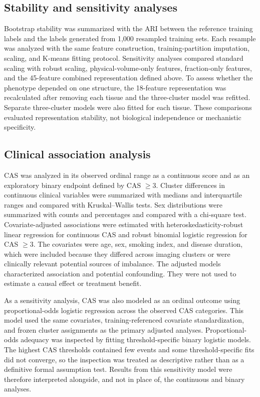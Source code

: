 \documentclass[utf8]{FrontiersinVancouver}
\begin{document}
\subsection{Stability and sensitivity analyses}
Bootstrap stability was summarized with the ARI between the reference training labels and the labels generated from 1,000 resampled training sets. Each resample was analyzed with the same feature construction, training-partition imputation, scaling, and K-means fitting protocol. Sensitivity analyses compared standard scaling with robust scaling, physical-volume-only features, fraction-only features, and the 45-feature combined representation defined above. To assess whether the phenotype depended on one structure, the 18-feature representation was recalculated after removing each tissue and the three-cluster model was refitted. Separate three-cluster models were also fitted for each tissue. These comparisons evaluated representation stability, not biological independence or mechanistic specificity.

\subsection{Clinical association analysis}
CAS was analyzed in its observed ordinal range as a continuous score and as an exploratory binary endpoint defined by CAS $\geq3$. Cluster differences in continuous clinical variables were summarized with medians and interquartile ranges and compared with Kruskal--Wallis tests. Sex distributions were summarized with counts and percentages and compared with a chi-square test. Covariate-adjusted associations were estimated with heteroskedasticity-robust linear regression for continuous CAS and robust binomial logistic regression for CAS $\geq3$. The covariates were age, sex, smoking index, and disease duration, which were included because they differed across imaging clusters or were clinically relevant potential sources of imbalance. The adjusted models characterized association and potential confounding. They were not used to estimate a causal effect or treatment benefit.

As a sensitivity analysis, CAS was also modeled as an ordinal outcome using proportional-odds logistic regression across the observed CAS categories. This model used the same covariates, training-referenced covariate standardization, and frozen cluster assignments as the primary adjusted analyses. Proportional-odds adequacy was inspected by fitting threshold-specific binary logistic models. The highest CAS thresholds contained few events and some threshold-specific fits did not converge, so the inspection was treated as descriptive rather than as a definitive formal assumption test. Results from this sensitivity model were therefore interpreted alongside, and not in place of, the continuous and binary analyses.
\end{document}
